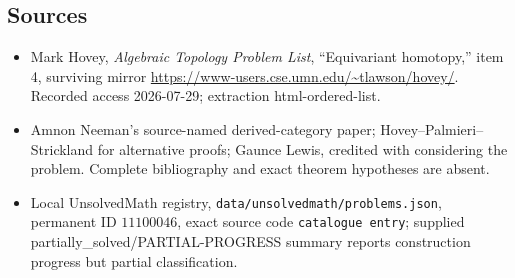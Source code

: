 \documentclass[11pt]{article}
\begin{document}
\subsection{Sources}
\begin{itemize}
\item Mark Hovey, \emph{Algebraic Topology Problem List}, ``Equivariant homotopy,'' item 4, surviving mirror \url{https://www-users.cse.umn.edu/~tlawson/hovey/}. Recorded access 2026-07-29; extraction html-ordered-list.
\item Amnon Neeman's source-named derived-category paper; Hovey--Palmieri--Strickland for alternative proofs; Gaunce Lewis, credited with considering the problem. Complete bibliography and exact theorem hypotheses are absent.
\item Local UnsolvedMath registry, \texttt{data/unsolvedmath/problems.json}, permanent ID \(11100046\), exact source code \texttt{catalogue entry}; supplied partially\_solved/PARTIAL-PROGRESS summary reports construction progress but partial classification.
\end{itemize}
\end{document}

